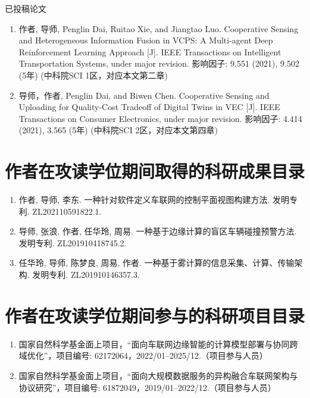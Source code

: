已投稿论文

\begin{enumerate}
	\item 作者\textbf{}, 导师, Penglin Dai, Ruitao Xie, and Jiangtao Luo. Cooperative Sensing and Heterogeneous Information Fusion in VCPS: A Multi-agent Deep Reinforcement Learning Approach [J]. IEEE Transactions on Intelligent Transportation Systems, under major revision. 影响因子: 9.551 (2021), 9.502 (5年) (中科院SCI 1区，对应本文第二章)
	\item 导师，作者\textbf{}, Penglin Dai, and Biwen Chen. Cooperative Sensing and Uploading for Quality-Cost Tradeoff of Digital Twins in VEC [J]. IEEE Transactions on Consumer Electronics, under major revision. 影响因子: 4.414 (2021), 3.565 (5年) (中科院SCI 2区，对应本文第四章) 
\end{enumerate}

\section{作者在攻读学位期间取得的科研成果目录}
\begin{enumerate}
	\item 作者\textbf{}, 导师, 李东. 一种针对软件定义车联网的控制平面视图构建方法. 发明专利. ZL202110591822.1.
	\item 导师, 张浪, 作者\textbf{}, 任华玲, 周易. 一种基于边缘计算的盲区车辆碰撞预警方法. 发明专利. ZL201910418745.2.
	\item 任华玲, 导师, 陈梦良, 周易, 作者\textbf{}. 一种基于雾计算的信息采集、计算、传输架构. 发明专利. ZL201910146357.3.
\end{enumerate}

\section{作者在攻读学位期间参与的科研项目目录}
\begin{enumerate}
	\item 国家自然科学基金面上项目，“面向车联网边缘智能的计算模型部署与协同跨域优化”，项目编号: 62172064，2022/01–2025/12.（项目参与人员）
	\item 国家自然科学基金面上项目，“面向大规模数据服务的异构融合车联网架构与协议研究”，项目编号: 61872049，2019/01–2022/12.（项目参与人员）
\end{enumerate}

